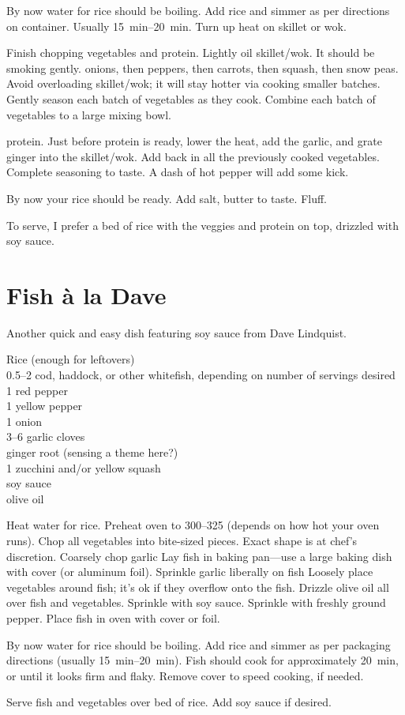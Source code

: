 By now water for rice should be boiling. Add rice and simmer as per directions
on container. Usually \SIrange{15}{20}{\minute}. Turn up heat on skillet or wok.

Finish chopping vegetables and protein. Lightly oil skillet/wok. It should be
smoking gently. \Saute onions, then peppers, then carrots, then squash, then
snow peas. Avoid overloading skillet/wok; it will stay hotter via cooking
smaller batches. Gently season each batch of vegetables as they cook. Combine
each batch of \sauteed vegetables to a large mixing bowl.

\Saute protein. Just before protein is ready, lower the heat, add the garlic,
and grate ginger into the skillet/wok. Add back in all the previously cooked
vegetables. Complete seasoning to taste. A dash of hot pepper will add some
kick.

By now your rice should be ready. Add salt, butter to taste. Fluff.

To serve, I prefer a bed of rice with the veggies and protein on top, drizzled
with soy sauce.

\section{Fish \`{a} la Dave}

\begin{open}
    Another quick and easy dish featuring soy sauce from Dave Lindquist.
\end{open}
\begin{ingredients}
    Rice (enough for leftovers)\\
    \SIrange{0.5}{2}{\pound} cod, haddock, or other whitefish, depending on
    number of servings desired\\
    1 red pepper\\
    1 yellow pepper\\
    1 onion\\
    \numrange{3}{6} garlic cloves\\
    ginger root (sensing a theme here?)\\
    1 zucchini and/or yellow squash\\
    soy sauce\\
    olive oil\\
\end{ingredients}
Heat water for rice. Preheat oven to \SIrange{300}{325}{\degreeF} (depends on
how hot your oven runs). Chop all vegetables into bite-sized pieces. Exact shape
is at chef's discretion. Coarsely chop garlic Lay fish in baking pan---use a
large baking dish with cover (or aluminum foil). Sprinkle garlic liberally on
fish Loosely place vegetables around fish; it's ok if they overflow onto the
fish. Drizzle olive oil all over fish and vegetables. Sprinkle with soy sauce.
Sprinkle with freshly ground pepper. Place fish in oven with cover or foil.

By now water for rice should be boiling. Add rice and simmer as per packaging
directions (usually \SIrange{15}{20}{\minute}). Fish should cook for
approximately \SI{20}{\minute}, or until it looks firm and flaky. Remove cover
to speed cooking, if needed.

Serve fish and vegetables over bed of rice. Add soy sauce if desired.